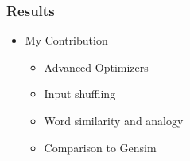 \begin{frame}\frametitle{Results}
\begin{itemize}
\item My Contribution
\begin{itemize}
\item Advanced Optimizers
\item Input shuffling
\item Word similarity and analogy
\item Comparison to Gensim
\end{itemize}

\end{itemize}
\end{frame}